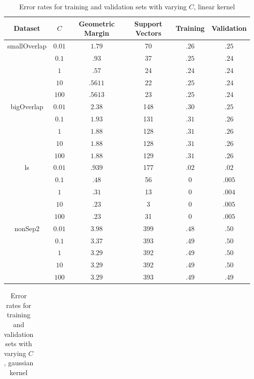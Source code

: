 \documentclass[10pt]{article}
\begin{document}
\begin{table}
\centering
\begin{tabular}{c|c|c|c|c|c}
Dataset 	 &	 $C$  & Geometric Margin & Support Vectors & Training & Validation \\ \hline
smallOverlap & $0.01$ 	& $1.79$		& 70 			& $.26$ & $.25$ \\
			& $0.1$		& $.93$			& 37		& $.25$ & $.24$ \\
			& $1$		& $.57$			& 24		& $.24$ & $.24$ \\
			& $10$		& $.5611$		& 22 		& $.25$ & $.24$ \\
			& $100$ 	& $.5613$		& 23		& $.25$ & $.24$ \\
bigOverlap & $0.01$ 	& $2.38$		& 148 		& $.30$ & $.25$ \\
			& $0.1$		& $1.93$		& 131		& $.31$ & $.26$ \\
			& $1$		& $1.88$		& 128		& $.31$ & $.26$ \\
			& $10$		& $1.88$		& 128 		& $.31$ & $.26$ \\
			& $100$ 	& $1.88$		& 129		& $.31$ & $.26$ \\
ls 			& $0.01$ 	& $.939$		& 177		& $.02$ & $.02$ \\
			& $0.1$		& $.48 $		& 56		& $0  $ & $.005$ \\
			& $1$		& $.31$	 		& 13		& $0  $ & $.004$ \\
			& $10$		& $.23$			& 3 		& $0 $ & $.005$ \\
			& $100$ 	& $.23$			& 31		& $0 $ & $.005$ \\
nonSep2 	& $0.01$ 	& $3.98$		& 399 		& $.48$ & $.50$ \\
			& $0.1$		& $3.37$		& 393		& $.49$ & $.50$ \\
			& $1$		& $3.29$		& 392		& $.49$ & $.50$ \\
			& $10$		& $3.29$		& 392		& $.49$ & $.50$ \\
			& $100$ 	& $3.29$		& 393		& $.49$ & $.49$ \\
\end{tabular}
\caption{Error rates for training and validation sets with varying $C$, linear kernel}
\label{tbl:1-3-linear}
\end{table}


\begin{table}
\centering
\begin{tabular}{c|c|c|c}

\end{tabular}
\caption{Error rates for training and validation sets with varying $C$, gaussian kernel}
\label{tbl:1-3-gaussian}
\end{table}
\end{document}
